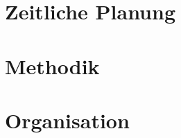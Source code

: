 \documentclass[a4paper,11pt]{scrartcl}
\begin{document}



\section{Zeitliche Planung}


\section{Methodik}


\section{Organisation}


\end{document}
